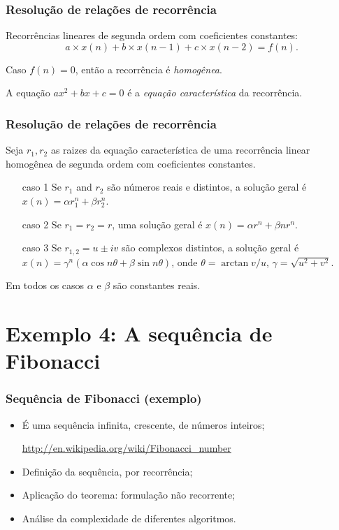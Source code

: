 \documentclass[handout]{beamer}
\begin{document}
\begin{frame}
\frametitle{Resolução de relações de recorrência}

Recorrências lineares de segunda ordem com coeficientes constantes:
$$a \times x(n) + b \times x(n-1) + c \times x(n-2) = f(n).$$

Caso $f(n) = 0$, então a recorrência é \emph{homogênea}.

\pause

A equação $ax^2 + bx + c = 0$ é a \emph{equação característica} da recorrência.
\end{frame}

\begin{frame}
\frametitle{Resolução de relações de recorrência}

\begin{theorem}
Seja $r_1, r_2$ as raizes da equação característica de uma recorrência linear homogênea de segunda ordem com coeficientes constantes.
\begin{enumerate}
\item[caso 1] Se $r_1$ and $r_2$ são números reais e distintos, a solução geral é $x(n) = \alpha r_1^n + \beta r_2^n$.
\item[caso 2] Se $r_1 = r_2 = r$, uma solução geral é $x(n) = \alpha r^n + \beta  n r^n$.
\item[caso 3] Se $r_{1,2} = u \pm iv$ são complexos distintos, a solução geral é $x(n) = \gamma^n(\alpha \cos n \theta + \beta \sin n \theta)$, onde $\theta = \arctan v/u$, $\gamma = \sqrt{u^2 + v^2}$.
\end{enumerate}
Em todos os casos $\alpha$ e $\beta$ são constantes reais.
\end{theorem}

\end{frame}

\section{Exemplo 4: A sequência de Fibonacci}

\begin{frame}
\frametitle{Sequência de Fibonacci (exemplo)}

\begin{itemize}

  \item É uma sequência infinita, crescente, de números inteiros;

    \url{http://en.wikipedia.org/wiki/Fibonacci_number}

  \item Definição da sequência, por recorrência;

  \item Aplicação do teorema: formulação não recorrente;

  \item Análise da complexidade de diferentes algoritmos.

\end{itemize}

\end{frame}
\end{document}
